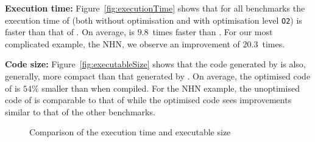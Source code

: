 \textbf{Execution time:} Figure~\ref{fig:executionTime} shows that for
all benchmarks the execution time of \ourTool (both without optimisation
and with optimisation level \texttt{O2}) is faster than that of
\simulink.  On average,  \ourTool is $9.8$~times faster than
\simulink.
For our most complicated example, the \ac{NHN}, we observe an improvement of 
$20.3$~times.

\textbf{Code size:} Figure~\ref{fig:executableSize} shows that the code
generated by \ourTool is also, generally, more compact than that
generated by \simulink.  On average, the optimised code of \ourTool is
$54\%$ smaller than \simulink when compiled.
For the \ac{NHN} example, the unoptimised code of \ourTool is comparable to 
that of \simulink while the optimised code sees improvements similar to that of 
the other benchmarks.


\begin{figure}[htbp]
	\centering
	\addtolength{\subfigcapskip}{-8pt}
	\caption{Comparison of the execution time  and executable size
		\label{fig:results}
	}
	\vspace{-0.4 cm}
\end{figure}


